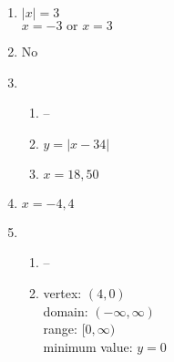 \documentclass{article}
\begin{document}
\begin{enumerate}
\item $|x| = 3$ \\
	$x = -3 \text{ or } x = 3$
	
\item No
	
\item

	\begin{enumerate}
	
	\item --
	
	\item $y = |x - 34|$
	
	\item $x = 18, 50$
	
	\end{enumerate}
	
\item $x = -4, 4$

\item

	\begin{enumerate}
	
	\item --
	
	\item vertex: $(4, 0)$ \\
		domain: $(-\infty, \infty)$ \\
		range: $[0, \infty)$ \\
		minimum value: $y = 0$
	
	\end{enumerate}
	
\end{enumerate}
\end{document}
